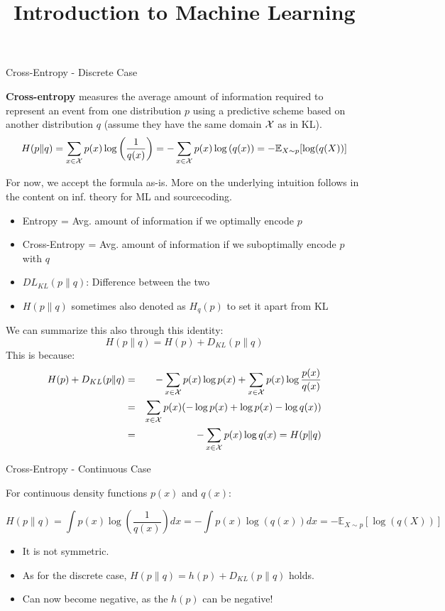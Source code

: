 \documentclass[11pt,compress,t,notes=noshow, xcolor=table]{beamer}
\title{Introduction to Machine Learning}
\date{}
\begin{document}


\begin{vbframe} {Cross-Entropy - Discrete Case}

\textbf{Cross-entropy} measures the average amount of information required to represent an event from one distribution $p$ using a predictive scheme based on another distribution $q$ (assume they have the same domain $\mathcal{X}$ as in KL).
  $$ H(p \| q) = \sum_{x \in \mathcal{X}} p(x) \log\left(\frac{1}{q(x)}\right) = - \sum_{x \in \mathcal{X}} p(x) \log\left(q(x)\right) = - \mathbb{E}_{X\sim p}[\log(q(X))]$$

For now, we accept the formula as-is. More on the underlying intuition follows in the content on inf. theory for ML and sourcecoding.
\begin{itemize}
\setlength{\itemsep}{0.9em}
\item Entropy = Avg. amount of information if we optimally encode $p$
\item Cross-Entropy = Avg. amount of information if we suboptimally encode $p$ with $q$
\item $DL_ {KL}(p \| q)$: Difference between the two
\item $H(p \| q)$ sometimes also denoted as $H_{q}(p)$ to set it apart from KL
\end{itemize}

\framebreak

We can summarize this also through this identity: 
\lz
$$
H(p \| q) = H(p) + D_{KL}(p \| q)
$$
This is because: 
\begin{eqnarray*}
H(p) + D_{KL}(p \| q) &=& - \sum_{x \in \mathcal{X}} p(x) \log p(x) + \sum_{x \in \mathcal{X}} p(x) \log \frac{p(x)}{q(x)} \\
                      &=& \sum_{x \in \mathcal{X}} p(x) (-\log p(x) +  \log p(x) - \log q(x)) \\
&=& - \sum_{x \in \mathcal{X}} p(x) \log q(x) = H(p \| q) \\
\end{eqnarray*}
   
\framebreak
\end{vbframe}

\begin{vbframe} {Cross-Entropy - Continuous Case}

For continuous density functions $p(x)$ and $q(x)$: 

$$ H(p \| q) = \int p(x) \log\left(\frac{1}{q(x)}\right) dx = - \int p(x) \log\left(q(x)\right) dx = - \mathbb{E}_{X \sim p}[\log(q(X))]$$

\begin{itemize}
\item It is not symmetric.
\item As for the discrete case, $H(p \| q) = h(p) + D_{KL}(p \| q)$ holds.
\item Can now become negative, as the $h(p)$ can be negative! 
\end{itemize}
\end{vbframe}
 
\end{document}
